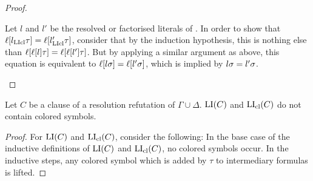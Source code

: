 \documentclass[,%
	draft=false,%
	numbers=noendperiod
	11pt,
	a4paper,
	oneside,%
	openany,
]{memoir}
\begin{document}
\begin{proof}
\begin{description}
			Let $l$ and $l'$ be the resolved or factorised literals of \inference.
			In order to show that $\ell[l_{\operatorname{LIcl}}\tau] = \ell[l'_{\operatorname{LIcl}}\tau]$,
			consider that by the induction hypothesis, this is nothing else than
			$\ell[\ell[l]\tau] = \ell[\ell[l']\tau]$.
			But by applying a similar argument as above, this equation is equivalent to
			$\ell[l\sigma] = \ell[l'\sigma]$, which is implied by $l\sigma =\nolinebreak l'\sigma$.
			\qedhere

			\begin{comment}
				Let $l$ and $l'$ be the resolved or factorised literals.
				By the induction hypothesis,
				$l\cll = \lifboth{l}$
				and
				$l'\cll = \lifboth{l'}$.

				By a similar reasoning as above, we get that $\lifboth{\lifboth{\lambda}\tau} = \lifboth{\lambda\sigma}$ for any literal $\lambda$ in $\bbar C$.

				$\lifboth{\lambda\cll\tau} = \lifboth{\lifboth{\lambda}\tau}$
				But as $l\sigma = l'\sigma$ and

				$\lifboth{\lifboth{l}\tau } =
				\lifboth{\lifboth{l'}\tau }
				$

				As no lifting variables occur in $l$ or $l'$, we get that $l\tau = l'\tau$, which we can lift to $\lifboth{l\tau} = \lifboth{l'\tau}$.

				Note that $l\sigma = l'\sigma$.

				$l\cll = \lifboth{l}$

				$\lifboth{ \lifboth{l} \tau} = \lifboth{l\tau}$

			\end{comment}
	\end{description}
\end{proof}


\begin{lemma}
	\label{lemma:no_colored_terms}
	Let $C$ be a clause of a resolution refutation of $\Gamma\cup\Delta$.
	$\operatorname{LI}(C)$ and $\operatorname{LI}_{\operatorname{cl}}(C)$ do not contain colored symbols.
\end{lemma}
\begin{proof}
	For $\operatorname{LI}(C)$ and $\operatorname{LI}_{\operatorname{cl}}(C)$, consider the following:
	In the base case of the inductive definitions of $\operatorname{LI}(C)$ and $\operatorname{LI}_{\operatorname{cl}}(C)$, no colored symbols occur.
	In the inductive steps, any colored symbol which is added by $\tau$ to intermediary formulas is lifted.
\end{proof}
\end{document}
